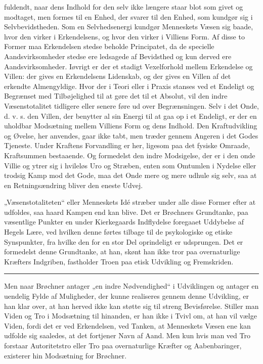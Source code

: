 \documentclass[12pt,a4paper,openany]{book}
\newcommand{\opage}[1]{\marginnote{\footnotesize\textit{[#1]}}}
\begin{document}
fuldendt, naar dens Indhold for den selv ikke længere staar blot som givet og
modtaget, men formes til en Enhed, der svarer til den Enhed, som kundgør sig i
Selvbevidstheden. Som en Selvhedsenergi kundgør Menneskets Væsen sig baade,
hvor den virker i Erkendelsens, og hvor den virker i Villiens Form. Af disse to
Former maa Erkendelsen stedse beholde Principatet, da de specielle
Aandsvirksomheder stedse ere ledsagede af Bevidsthed og kun derved ere
Aandsvirksomheder. Iøvrigt er der et stadigt Vexelforhold mellem Erkendelse og
Villen: der gives en Erkendelsens Lidenskab, og der gives en Villen af det
erkendte Almengyldige. Hvor der i Teori eller i Praxis stanses ved et Endeligt
og Begrænset med Tilbøjelighed til at gøre det til et Absolut, vil den indre
Væsenstotalitet tidligere eller senere føre ud over Begrænsningen. Selv i det
Onde, d. v. s. den Villen, der benytter al sin Energi til at gaa op i et
Endeligt, er der en uholdbar Modsætning mellem Villiens Form og dens Indhold.
Den Kraftudvikling og Øvelse, her anvendes, gaar ikke tabt, men træder gennem
Angeren i det Godes Tjeneste. Under Kraftens Forvandling
\setcounter{footnote}{0}%
\opage{202}er her, ligesom paa det fysiske Omraade, Kraftsummen bestaaende. Og
formedelst den indre Modsigelse, der er i den onde Villie og ytrer sig i
hvileløs Uro og Stræben, enten som Omtumlen i Nydelse eller trodsig Kamp mod
det Gode, maa det Onde mere og mere udhule sig selv, saa at en Retningsændring
bliver den eneste Udvej.

„Væsenstotaliteten“ eller Menneskets Idé stræber under alle disse Former efter
at udfoldes, saa haard Kampen end kan blive. Det er Brøchners Grundtanke, paa
væsentlige Punkter en under Kierkegaards Indflydelse foregaaet Uddybelse af
Hegels Lære, ved hvilken denne førtes tilbage til de psykologiske og etiske
Synspunkter, fra hvilke den for en stor Del oprindeligt er udsprungen. Det er
formedelst denne Grundtanke, at han, skønt han ikke tror paa overnaturlige
Kræfters Indgriben, fastholder Troen paa etisk Udvikling og Fremskriden.

\begin{center}\rule{2cm}{0.4pt}\end{center}

Men naar Brøchner antager „en indre Nødvendighed“ i Udviklingen og antager en
uendelig Fylde af Muligheder, der kunne realiseres gennem denne Udvikling, er
han klar over, at han herved ikke kan støtte sig til streng Bevisførelse.
Stiller man Viden og Tro i Modsætning til hinanden, er han ikke i Tvivl om, at
han vil vælge Viden, fordi det er ved Erkendelsen, ved Tanken, at Menneskets
Væsen ene kan udfolde sig saaledes, at det fortjener Navn af Aand. Men kun hvis
man ved Tro forstaar Autoritetstro eller Tro paa overnaturlige Kræfter og
Aabenbaringer, existerer hin Modsætning for Brøchner.
\end{document}
